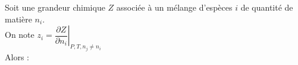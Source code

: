 ﻿\documentclass[a4paper]{article}
\begin{document}
\pagestyle{fancy}
\fancyhf{}
\setlength{\headheight}{15pt}

\begin{center}
	\large{}
\end{center}


Soit une grandeur chimique \(Z\) associée à un mélange d'espèces \(i\) de quantité de matière \(n_i\).\\
On note \(z_i=\left.\dfrac{\partial Z}{\partial n_i}\right|_{P,T,n_j\neq n_i}\)\\
Alors :\begin{center}\end{center}
\end{document}

